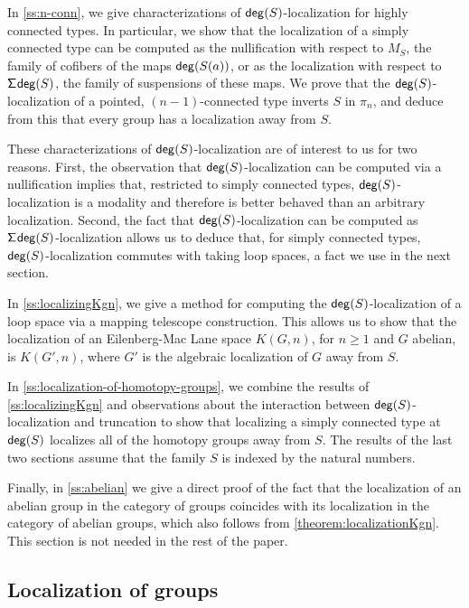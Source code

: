 In \cref{ss:n-conn}, we give characterizations of $\mathsf{deg}(S)$-localization for highly connected types. In particular, we show that the localization of a simply connected type can be computed as the nullification with respect to $M_S$, the family of cofibers of the maps $\mathsf{deg}(S(a))$, or as the localization with respect to $\mathsf{\Sigma}^{} \mathsf{deg}(S)$, the family of suspensions of these maps.
We prove that the $\mathsf{deg}(S)$-localization of a pointed, $(n-1)$-connected type inverts $S$ in $\pi_n$,
and deduce from this that every group has a localization away from $S$.

These characterizations of $\mathsf{deg}(S)$-localization are of interest to us for two reasons. First, the observation that $\mathsf{deg}(S)$-localization can be computed via a nullification implies that, restricted to simply connected types, $\mathsf{deg}(S)$-localization is a modality and therefore is better behaved than an arbitrary localization. Second, the fact that $\mathsf{deg}(S)$-localization can be computed as $\mathsf{\Sigma}^{} \mathsf{deg}(S)$-localization allows us to deduce that, for simply connected types, $\mathsf{deg}(S)$-localization commutes with taking loop spaces, a fact we use in the next section.

In \cref{ss:localizingKgn}, we give a method for computing the $\mathsf{deg}(S)$-localization of a loop space via a mapping telescope construction. This allows us to show that the localization of an Eilenberg-Mac Lane space $K(G,n)$, for $n \geq 1$ and $G$ abelian, is $K(G',n)$, where $G'$ is the algebraic localization of $G$ away from $S$.

In \cref{ss:localization-of-homotopy-groups}, we combine the results of \cref{ss:localizingKgn} and observations about the interaction between $\mathsf{deg}(S)$-localization and truncation to show that localizing a simply connected type at $\mathsf{deg}(S)$ localizes all of the homotopy groups away from $S$.
The results of the last two sections assume that the family $S$ is indexed by the natural numbers.

Finally, in \cref{ss:abelian} we give a direct proof of the fact that
the localization of an abelian group in the category of groups coincides with
its localization in the category of abelian groups, which also follows from
\cref{theorem:localizationKgn}.
This section is not needed in the rest of the paper.

\subsection{Localization of groups}\label{ss:localizationofgroups}

